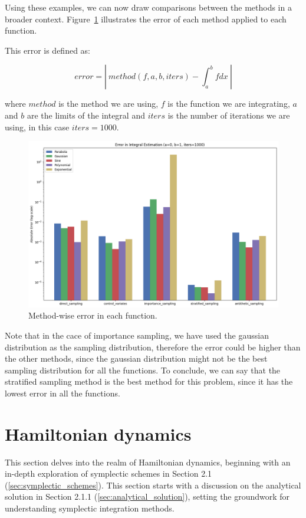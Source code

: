 \documentclass{article}
\begin{document}
Using these examples, we can now draw comparisons between the methods in a broader context. Figure~\ref{fig:comparisonvariancereduction2} illustrates the error of each method applied to each function.

This error is defined as:

\begin{equation*} error = | \ method(f, a, b, iters) - \int_a^b{f dx} \ | \end{equation*}

where \(method\) is the method we are using, \(f\) is the function we are integrating, \(a\) and \(b\) are the limits of the integral and \(iters\) is the number of iterations we are using, in this case \(iters = 1000\).

\begin{figure}[H]
\centering
\includegraphics[width=0.8\linewidth]{./Figures/VarianceReduction/comparison2.png}
\caption{Method-wise error in each function.}
\label{fig:comparisonvariancereduction2}
\end{figure}

Note that in the cace of importance sampling, we have used the gaussian distribution as the sampling distribution, therefore the error could be higher than the other methods, since the gaussian distribution might not be the best sampling distribution for all the functions. To conclude, we can say that the stratified sampling method is the best method for this problem, since it has the lowest error in all the functions. 

\section{Hamiltonian dynamics}
\label{sec:hamiltonian_dynamics}

This section delves into the realm of Hamiltonian dynamics, beginning with an in-depth exploration of symplectic schemes in Section 2.1 (\ref{sec:symplectic_schemes}). This section starts with a discussion on the analytical solution in Section 2.1.1 (\ref{sec:analytical_solution}), setting the groundwork for understanding symplectic integration methods.
\end{document}
